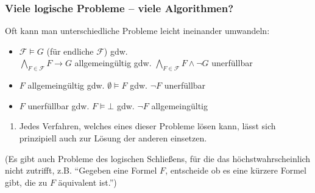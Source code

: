 \documentclass[aspectratio=1610,onlymath]{beamer}
\begin{document}
\begin{frame}\frametitle{Viele logische Probleme -- viele Algorithmen?}

Oft kann man unterschiedliche Probleme leicht ineinander umwandeln:
\medskip

\begin{itemize}
\item $\mathcal{F}\models G$ (für endliche $\mathcal{F}$) \alert{gdw.}\\ $\bigwedge_{F\in\mathcal{F}}F\to G$ allgemeingültig \alert{gdw.} $\bigwedge_{F\in\mathcal{F}}F\wedge\neg G$ unerfüllbar
\item $F$ allgemeingültig \alert{gdw.} $\emptyset\models F$ \alert{gdw.} $\neg F$ unerfüllbar
\item $F$ unerfüllbar \alert{gdw.} $F\models \bot$ \alert{gdw.} $\neg F$ allgemeingültig
\end{itemize}
\begin{enumerate}[$\leadsto$]
\item Jedes Verfahren, welches eines dieser Probleme lösen kann, lässt sich prinzipiell auch zur Lösung der anderen einsetzen.
\end{enumerate}

{\footnotesize\textcolor{devilscss}{%
(Es gibt auch Probleme des logischen Schließens, für die das höchstwahrscheinlich nicht zutrifft, z.B. "`Gegeben eine Formel $F$, entscheide ob es eine kürzere Formel gibt, die zu $F$ äquivalent ist."')}
}

\end{frame}
\end{document}
